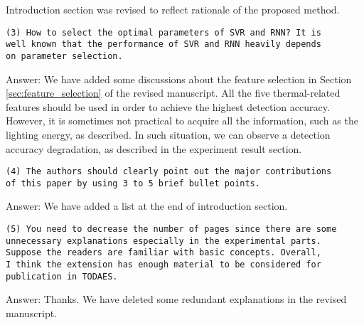 Introduction section was revised to reflect rationale of the
proposed method.

\begin{verbatim}
(3) How to select the optimal parameters of SVR and RNN? It is
well known that the performance of SVR and RNN heavily depends
on parameter selection.
\end{verbatim}

Answer: We have added some discussions about the feature selection in
Section \ref{sec:feature_selection} of the revised manuscript. All the five thermal-related
features should be used in order to achieve the highest detection accuracy.
However, it is sometimes not practical to acquire all the information,
such as the lighting energy, as described. In such situation, we can
observe a detection accuracy degradation, as described
in the experiment result section.




\begin{verbatim}
(4) The authors should clearly point out the major contributions
of this paper by using 3 to 5 brief bullet points.
\end{verbatim}

Answer: We have added a list at the end of introduction section.


\begin{verbatim}
(5) You need to decrease the number of pages since there are some
unnecessary explanations especially in the experimental parts.
Suppose the readers are familiar with basic concepts. Overall,
I think the extension has enough material to be considered for
publication in TODAES.
\end{verbatim}

Answer: Thanks. We have deleted some redundant explanations in the revised manuscript.
